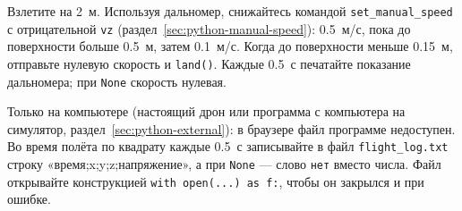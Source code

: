 \begin{taskbox}
Взлетите на 2~м. Используя дальномер, снижайтесь командой \verb|set_manual_speed| с отрицательной \verb|vz| (раздел~\ref{sec:python-manual-speed}): 0.5~м/с, пока до поверхности больше 0.5~м, затем 0.1~м/с. Когда до поверхности меньше 0.15~м, отправьте нулевую скорость и \verb|land()|. Каждые 0.5~с печатайте показание дальномера; при \verb|None| скорость нулевая.
\end{taskbox}

\begin{taskbox}
Только на компьютере (настоящий дрон или программа с компьютера на симулятор, раздел~\ref{sec:python-external}): в браузере файл программе недоступен. Во время полёта по квадрату каждые 0.5~с записывайте в файл \texttt{flight\_log.txt} строку «время;x;y;z;напряжение», а при \texttt{None} --- слово \texttt{нет} вместо числа. Файл открывайте конструкцией \verb|with open(...) as f:|, чтобы он закрылся и при ошибке.
\end{taskbox}
